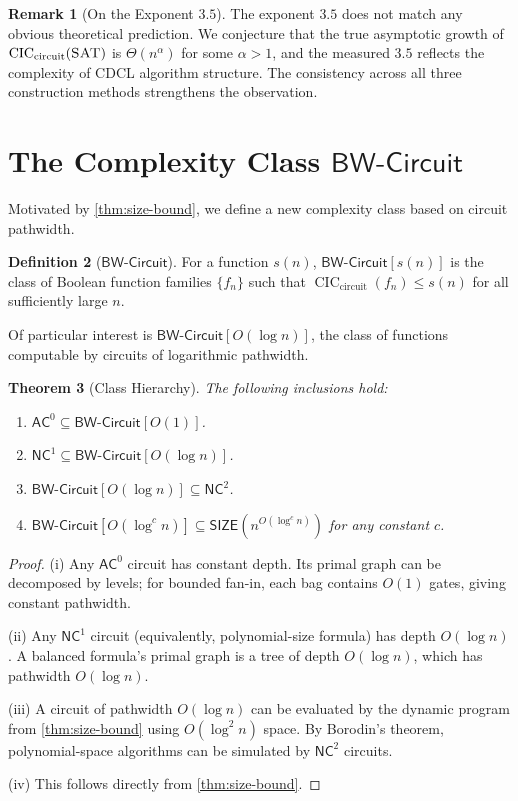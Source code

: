 \documentclass[11pt]{article}
\theoremstyle{plain}
\newtheorem{theorem}{Theorem}[section]
\theoremstyle{definition}
\newtheorem{definition}[theorem]{Definition}
\newtheorem{remark}[theorem]{Remark}
\newcommand{\CIC}{\operatorname{CIC}}
\newcommand{\CICcirc}{\CIC_{\text{circuit}}}
\newcommand{\SAT}{\textsc{SAT}}
\newcommand{\SIZE}{\mathsf{SIZE}}
\newcommand{\NC}{\mathsf{NC}}
\newcommand{\AC}{\mathsf{AC}}
\newcommand{\BWCircuit}{\mathsf{BW\text{-}Circuit}}
\newcommand{\set}[1]{\{#1\}}
\begin{document}
\begin{remark}[On the Exponent $3.5$]
The exponent $3.5$ does not match any obvious theoretical prediction. We conjecture that the true asymptotic growth of $\CICcirc(\SAT)$ is $\Theta(n^\alpha)$ for some $\alpha > 1$, and the measured $3.5$ reflects the complexity of CDCL algorithm structure. The consistency across all three construction methods strengthens the observation.
\end{remark}


\section{The Complexity Class $\BWCircuit$}\label{sec:bw-class}

Motivated by \cref{thm:size-bound}, we define a new complexity class based on circuit pathwidth.

\begin{definition}[$\BWCircuit$]\label{def:bw}
For a function $s(n)$, $\BWCircuit[s(n)]$ is the class of Boolean function families $\set{f_n}$ such that $\CICcirc(f_n) \leq s(n)$ for all sufficiently large $n$.
\end{definition}

Of particular interest is $\BWCircuit[O(\log n)]$, the class of functions computable by circuits of logarithmic pathwidth.

\begin{theorem}[Class Hierarchy]\label{thm:hierarchy}
The following inclusions hold:
\begin{enumerate}[label=(\roman*)]
    \item $\AC^0 \subseteq \BWCircuit[O(1)]$.
    \item $\NC^1 \subseteq \BWCircuit[O(\log n)]$.
    \item $\BWCircuit[O(\log n)] \subseteq \NC^2$.
    \item $\BWCircuit[O(\log^c n)] \subseteq \SIZE(n^{O(\log^c n)})$ for any constant $c$.
\end{enumerate}
\end{theorem}

\begin{proof}
(i) Any $\AC^0$ circuit has constant depth. Its primal graph can be decomposed by levels; for bounded fan-in, each bag contains $O(1)$ gates, giving constant pathwidth.

(ii) Any $\NC^1$ circuit (equivalently, polynomial-size formula) has depth $O(\log n)$. A balanced formula's primal graph is a tree of depth $O(\log n)$, which has pathwidth $O(\log n)$.

(iii) A circuit of pathwidth $O(\log n)$ can be evaluated by the dynamic program from \cref{thm:size-bound} using $O(\log^2 n)$ space. By Borodin's theorem, polynomial-space algorithms can be simulated by $\NC^2$ circuits.

(iv) This follows directly from \cref{thm:size-bound}.
\end{proof}
\end{document}
